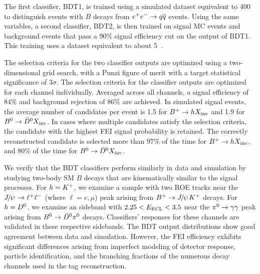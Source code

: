 The first classifier, BDT1, is trained using a simulated dataset equivalent to 400 \invfb to distinguish events with $B$ decays from $e^+e^-\rightarrow q\overline q$ events. Using the same variables, a second classifier, BDT2, is then trained on signal MC events and background events that pass a 90\% signal efficiency cut on the output of BDT1. This training uses a dataset equivalent to about 5~\invab.


The selection criteria for the two classifier outputs are optimized using a two-dimensional grid search, with a Punzi figure of merit \cite{Punzi:2003bu} with a target statistical significance of $3\sigma$. The selection criteria for the classifier outputs are optimized for each channel individually. Averaged across all channels, a signal efficiency of 84\% and background rejection of 86\% are achieved. In simulated signal events, the average number of candidates per event is 1.5 for $B^+\rightarrow hX_{\rm{inv}}$ and 1.9 for $B^0\rightarrow\kern 0.2em\bar{\kern -0.2em D}{}^0X_{\rm{inv}}$.
In cases where multiple candidates satisfy the selection criteria, the candidate with the highest FEI signal probability is retained.
The correctly reconstructed candidate is selected more than $97\%$ of the time for $B^+\rightarrow hX_{\rm{inv}}$, and $80\%$ of the time for $B^0\rightarrow\kern 0.2em\bar{\kern -0.2em D}{}^0X_{\rm{inv}}$.


We verify that the BDT classifiers perform similarly in data and simulation by studying two-body SM $B$ decays that are kinematically similar to the signal processes. For $h = K^+$, we examine a sample with two ROE tracks near the ${J\mskip -3mu/\mskip -2mu\psi\mskip 2mu}\rightarrow\ell^+\ell^-$ (where $\ell = e, \mu$) peak arising from $B^+ \rightarrow {J\mskip -3mu/\mskip -2mu\psi\mskip 2mu} K^+$ decays. For $h = D^0$, we examine an \eecl sideband with $2.25 < E_{\rm{ECL}} < 3.5$ \gev near the $\pi^0\rightarrow\gamma\gamma$ peak arising from $B^0\rightarrow\kern 0.2em\bar{\kern -0.2em D}{}^0\pi^0$ decays. Classifiers' responses for these channels are validated in these respective sidebands. The BDT output distributions show good agreement between data and simulation. However, the FEI efficiency exhibits significant differences arising from imperfect modeling of detector response, particle identification, and the branching fractions of the numerous decay channels used in the tag reconstruction.


